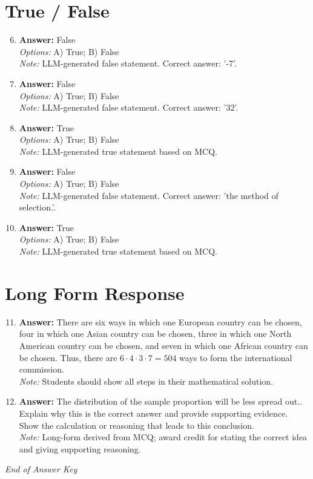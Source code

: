 \documentclass[12pt]{article}
\begin{document}
\section*{True / False}
\begin{enumerate}[label=\arabic*.]
\setcounter{enumi}{5}
\item \textbf{Answer:} False
\\ \textit{Options:} A) True; B) False
\\ \textit{Note:} LLM-generated false statement. Correct answer: '-7'.
\item \textbf{Answer:} False
\\ \textit{Options:} A) True; B) False
\\ \textit{Note:} LLM-generated false statement. Correct answer: '32'.
\item \textbf{Answer:} True
\\ \textit{Options:} A) True; B) False
\\ \textit{Note:} LLM-generated true statement based on MCQ.
\item \textbf{Answer:} False
\\ \textit{Options:} A) True; B) False
\\ \textit{Note:} LLM-generated false statement. Correct answer: 'the method of selection.'.
\item \textbf{Answer:} True
\\ \textit{Options:} A) True; B) False
\\ \textit{Note:} LLM-generated true statement based on MCQ.
\end{enumerate}

\section*{Long Form Response}
\begin{enumerate}[label=\arabic*.]
\setcounter{enumi}{10}
\item \textbf{Answer:} There are six ways in which one European country can be chosen, four in which one Asian country can be chosen, three in which one North American country can be chosen, and seven in which one African country can be chosen. Thus, there are $6 \cdot 4 \cdot 3 \cdot 7 = \boxed{504}$ ways to form the international commission.
\\ \textit{Note:} Students should show all steps in their mathematical solution.
\item \textbf{Answer:} The distribution of the sample proportion will be less spread out.. Explain why this is the correct answer and provide supporting evidence. Show the calculation or reasoning that leads to this conclusion.
\\ \textit{Note:} Long-form derived from MCQ; award credit for stating the correct idea and giving supporting reasoning.
\end{enumerate}

\vfill
\noindent\textit{End of Answer Key}
\end{document}
